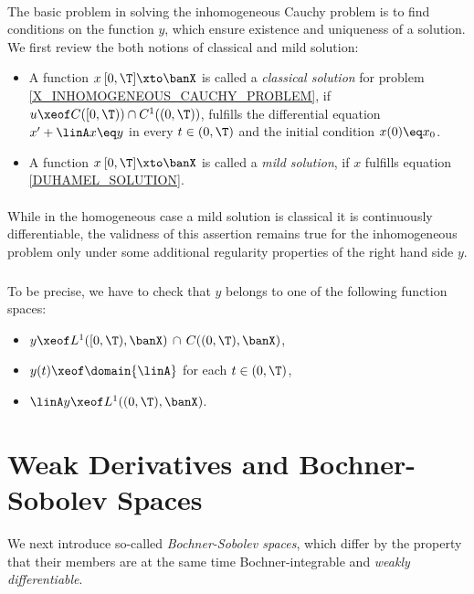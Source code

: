 \documentclass[11pt,twoside]{article}
\begin{document}
\paragraph{} %
The basic problem in solving the inhomogeneous Cauchy problem is to find
conditions on the function $y$,
which ensure existence and uniqueness of a solution.
We first review the both notions of classical and mild solution:

\begin{itemize}[leftmargin=5mm]
\item[1.]
A function $x \: [0,\T] \xto \banX$ is called a \textit{classical solution}
for problem \eqref{X_INHOMOGENEOUS_CAUCHY_PROBLEM},
if $u \xeof C([0,\T)) \cap C^1((0,\T))$,
fulfills the differential equation $x' + \linA x \eq y$ in every $t \in (0,\T)$
and the initial condition $x(0) \eq x_0$.
\item[2.]
A function $x \: [0,\T] \xto \banX$ is called a \textit{mild solution},
if $x$ fulfills equation \eqref{DUHAMEL_SOLUTION}.
\end{itemize}

\paragraph{}
While in the homogeneous case a mild solution is classical
\iff it is continuously differentiable,
the validness of this assertion remains true for the inhomogeneous problem
only
under some additional regularity properties of the right hand side $y$.

\subparagraph{}
To be precise,
we have to check that $y$ belongs to one of the following function spaces:

\begin{itemize}[leftmargin=30pt]
\item[1.]
$y \xeof L^1([0,\T),\banX) \, \cap \, C((0,\T),\banX)$,

\item[2.]
$y(t) \xeof \domain{\linA}$ for each $t \in (0,\T)$,

\item[3.]
$\linA y \xeof L^1((0,\T),\banX)$.
\end{itemize}

\section{Weak Derivatives and Bochner-Sobolev Spaces}
We next introduce so-called \textit{Bochner-Sobolev spaces},
which differ by the property
that their members are at the same time
Bochner-integrable and \textit{weakly differentiable}.
\end{document}
